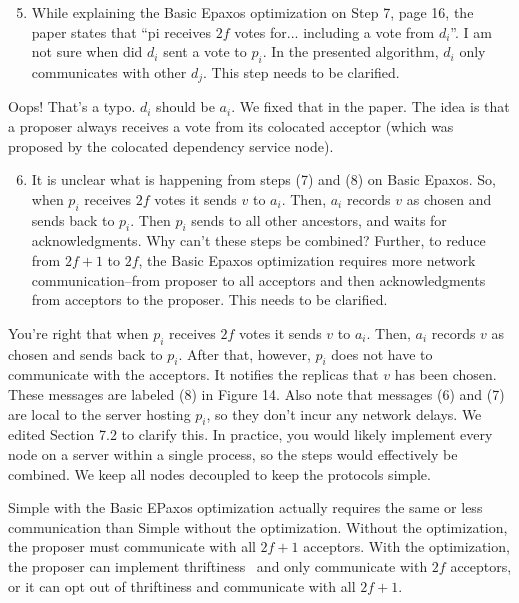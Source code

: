 \documentclass[letterpaper,twocolumn,10pt]{article}
\newenvironment{reviewerquote}
{\list{}{\leftmargin=\parindent\rightmargin=0in}\item[] \itshape \color{ReviewerDarkGray}}%
{\endlist}
\begin{document}
\begin{reviewerquote}
  \begin{enumerate}
    \setcounter{enumi}{4}
    \item
      While explaining the Basic Epaxos optimization on Step 7, page 16, the
      paper states that ``pi receives $2f$ votes for... including a vote from
      $d_i$''.  I am not sure when did $d_i$ sent a vote to $p_i$. In the
      presented algorithm, $d_i$ only communicates with other $d_j$. This step
      needs to be clarified.
  \end{enumerate}
\end{reviewerquote}

Oops! That's a typo. $d_i$ should be $a_i$. We fixed that in the paper. The
idea is that a proposer always receives a vote from its colocated acceptor
(which was proposed by the colocated dependency service node).

\begin{reviewerquote}
  \begin{enumerate}
    \setcounter{enumi}{5}
    \item
      It is unclear what is happening from steps (7) and (8) on Basic Epaxos.
      So, when $p_i$ receives $2f$ votes it sends $v$ to $a_i$. Then, $a_i$
      records $v$ as chosen and sends back to $p_i$. Then $p_i$ sends to all
      other ancestors, and waits for acknowledgments. Why can't these steps be
      combined? Further, to reduce from $2f+1$ to $2f$, the Basic Epaxos
      optimization requires more network communication--from proposer to all
      acceptors and then acknowledgments from acceptors to the proposer. This
      needs to be clarified.
  \end{enumerate}
\end{reviewerquote}

You're right that when $p_i$ receives $2f$ votes it sends $v$ to $a_i$. Then,
$a_i$ records $v$ as chosen and sends back to $p_i$. After that, however, $p_i$
does not have to communicate with the acceptors. It notifies the replicas that
$v$ has been chosen. These messages are labeled (8) in Figure 14. Also note
that messages (6) and (7) are local to the server hosting $p_i$, so they don't
incur any network delays. We edited Section 7.2 to clarify this. In practice,
you would likely implement every node on a server within a single process, so
the steps would effectively be combined. We keep all nodes decoupled to keep
the protocols simple.

Simple \BPaxos{} with the Basic EPaxos optimization actually requires the same
or less communication than Simple \BPaxos{} without the optimization. Without
the optimization, the proposer must communicate with all $2f+1$ acceptors. With
the optimization, the proposer can implement thriftiness~\cite{moraru2013there}
and only communicate with $2f$ acceptors, or it can opt out of thriftiness and
communicate with all $2f+1$.
\end{document}
